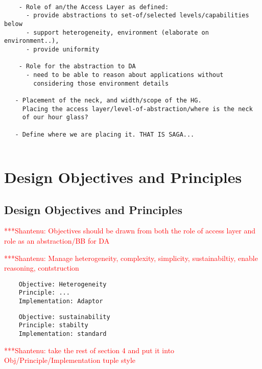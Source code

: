 \documentclass[a4paper,10pt]{article}
\newcommand{\jhanote}[1]{  {\textcolor{red}  { ***Shantenu: #1 }}}
\newcommand{\jhanote}[1]{}
\begin{document}
  \begin{verbatim}

    - Role of an/the Access Layer as defined:
      - provide abstractions to set-of/selected levels/capabilities below
      - support heterogeneity, environment (elaborate on environment..), 
      - provide uniformity

    - Role for the abstraction to DA 
      - need to be able to reason about applications without 
        considering those environment details

   - Placement of the neck, and width/scope of the HG.
     Placing the access layer/level-of-abstraction/where is the neck
     of our hour glass?

   - Define where we are placing it. THAT IS SAGA...


  \end{verbatim}

\section{Design Objectives and Principles}
\label{saga_impls}

 \subsection{Design Objectives and Principles}

 \jhanote{Objectives should be drawn from both the role of access layer and role as an
   abstraction/BB for DA}

 \jhanote{Manage heterogeneity, complexity, simplicity,
   sustainabiltiy, enable reasoning, contstruction}

  \begin{verbatim}
    Objective: Heterogeneity 
    Principle: ...
    Implementation: Adaptor
   \end{verbatim}

  \begin{verbatim}
    Objective: sustainability
    Principle: stabilty
    Implementation: standard
   \end{verbatim}

  \jhanote{take the rest of section 4 and put it into Obj/Principle/Implementation
    tuple style}
\end{document}
